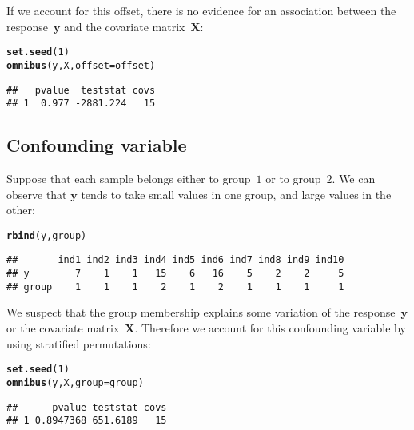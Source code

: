 \documentclass{article}\usepackage[]{graphicx}\usepackage[]{color}
\makeatletter
\newcommand{\hlnum}[1]{\textcolor[rgb]{0.686,0.059,0.569}{#1}}%
\newcommand{\hlstd}[1]{\textcolor[rgb]{0.345,0.345,0.345}{#1}}%
\newcommand{\hlkwc}[1]{\textcolor[rgb]{0.333,0.667,0.333}{#1}}%
\newcommand{\hlkwd}[1]{\textcolor[rgb]{0.737,0.353,0.396}{\textbf{#1}}}%
\newenvironment{kframe}{%
 \def\at@end@of@kframe{}%
 \ifinner\ifhmode%
  \def\at@end@of@kframe{\end{minipage}}%
  \begin{minipage}{\columnwidth}%
 \fi\fi%
 \def\FrameCommand##1{\hskip\@totalleftmargin \hskip-\fboxsep
 \colorbox{shadecolor}{##1}\hskip-\fboxsep
     \hskip-\linewidth \hskip-\@totalleftmargin \hskip\columnwidth}%
 \MakeFramed {\advance\hsize-\width
   \@totalleftmargin\z@ \linewidth\hsize
   \@setminipage}}%
 {\par\unskip\endMakeFramed%
 \at@end@of@kframe}
\newenvironment{knitrout}{}{} %
\makeatother
\begin{document}
If we account for this offset, there is no evidence for an association between the response~$\boldsymbol{y}$ and the covariate matrix~$\boldsymbol{X}$:
\begin{knitrout}
\color{fgcolor}\begin{kframe}
\begin{alltt}
\hlkwd{set.seed}\hlstd{(}\hlnum{1}\hlstd{)}
\hlkwd{omnibus}\hlstd{(y,X,}\hlkwc{offset}\hlstd{=offset)}
\end{alltt}
\begin{verbatim}
##   pvalue  teststat covs
## 1  0.977 -2881.224   15
\end{verbatim}
\end{kframe}
\end{knitrout}

\subsection{Confounding variable}
\label{TOA Confounding variable}

Suppose that each sample belongs either to group~$1$ or to group~$2$. We can observe that $\boldsymbol{y}$ tends to take small values in one group, and large values in the other:
\begin{knitrout}
\color{fgcolor}\begin{kframe}
\begin{alltt}
\hlkwd{rbind}\hlstd{(y,group)}
\end{alltt}
\begin{verbatim}
##       ind1 ind2 ind3 ind4 ind5 ind6 ind7 ind8 ind9 ind10
## y        7    1    1   15    6   16    5    2    2     5
## group    1    1    1    2    1    2    1    1    1     1
\end{verbatim}
\end{kframe}
\end{knitrout}

We suspect that the group membership explains some variation of the response~$\boldsymbol{y}$ or the covariate matrix~$\boldsymbol{X}$. Therefore we account for this confounding variable by using stratified permutations:
\begin{knitrout}
\color{fgcolor}\begin{kframe}
\begin{alltt}
\hlkwd{set.seed}\hlstd{(}\hlnum{1}\hlstd{)}
\hlkwd{omnibus}\hlstd{(y,X,}\hlkwc{group}\hlstd{=group)}
\end{alltt}
\begin{verbatim}
##      pvalue teststat covs
## 1 0.8947368 651.6189   15
\end{verbatim}
\end{kframe}
\end{knitrout}
\end{document}
